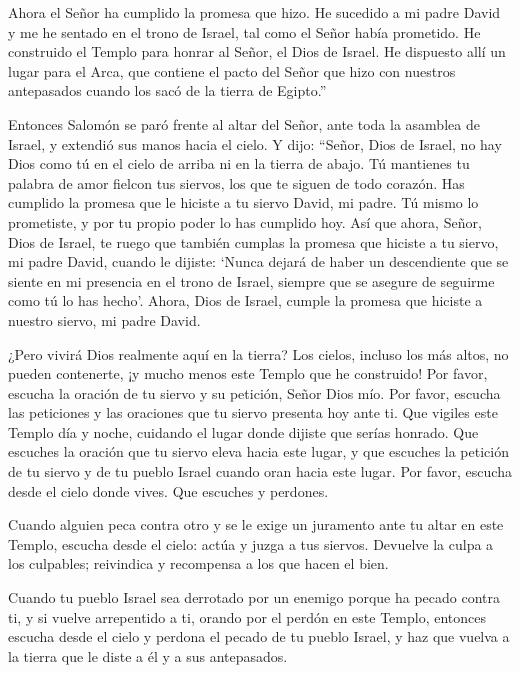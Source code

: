  Ahora el Señor ha cumplido la promesa que hizo. He
sucedido a mi padre David y me he sentado en el trono de Israel, tal
como el Señor había prometido. He construido el Templo para honrar al
Señor, el Dios de Israel.  He dispuesto allí un lugar para
el Arca, que contiene el pacto del Señor que hizo con nuestros
antepasados cuando los sacó de la tierra de Egipto.''

 Entonces Salomón se paró frente al altar del Señor, ante
toda la asamblea de Israel, y extendió sus manos hacia el cielo.
 Y dijo: ``Señor, Dios de Israel, no hay Dios como tú en el
cielo de arriba ni en la tierra de abajo. Tú mantienes tu palabra de
amor fielcon tus siervos, los que te siguen de todo corazón.
 Has cumplido la promesa que le hiciste a tu siervo David,
mi padre. Tú mismo lo prometiste, y por tu propio poder lo has cumplido
hoy.  Así que ahora, Señor, Dios de Israel, te ruego que
también cumplas la promesa que hiciste a tu siervo, mi padre David,
cuando le dijiste: `Nunca dejará de haber un descendiente que se siente
en mi presencia en el trono de Israel, siempre que se asegure de
seguirme como tú lo has hecho'.  Ahora, Dios de Israel,
cumple la promesa que hiciste a nuestro siervo, mi padre David.

 ¿Pero vivirá Dios realmente aquí en la tierra? Los cielos,
incluso los más altos, no pueden contenerte, ¡y mucho menos este Templo
que he construido!  Por favor, escucha la oración de tu
siervo y su petición, Señor Dios mío. Por favor, escucha las peticiones
y las oraciones que tu siervo presenta hoy ante ti.  Que
vigiles este Templo día y noche, cuidando el lugar donde dijiste que
serías honrado. Que escuches la oración que tu siervo eleva hacia este
lugar,  y que escuches la petición de tu siervo y de tu
pueblo Israel cuando oran hacia este lugar. Por favor, escucha desde el
cielo donde vives. Que escuches y perdones.

 Cuando alguien peca contra otro y se le exige un juramento
ante tu altar en este Templo,  escucha desde el cielo:
actúa y juzga a tus siervos. Devuelve la culpa a los culpables;
reivindica y recompensa a los que hacen el bien.

 Cuando tu pueblo Israel sea derrotado por un enemigo
porque ha pecado contra ti, y si vuelve arrepentido a ti, orando por el
perdón en este Templo,  entonces escucha desde el cielo y
perdona el pecado de tu pueblo Israel, y haz que vuelva a la tierra que
le diste a él y a sus antepasados.

